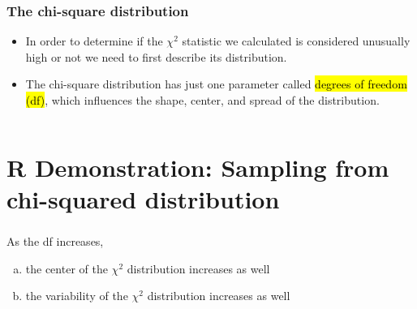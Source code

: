 \documentclass[slidestop,compress,mathserif]{beamer}
\begin{document}

\begin{frame}
\frametitle{The chi-square distribution}

\begin{itemize}

\item In order to determine if the $\chi^2$ statistic we calculated is considered unusually high or not we need to first describe its distribution.

\pause

\item The chi-square distribution has just one parameter called \hl{degrees of freedom (df)}, which influences the shape, center, and spread of the distribution. \\

\end{itemize}

\pause

$\:$ \\


\end{frame}


\section{R Demonstration: Sampling from chi-squared distribution}


\begin{frame}
\frametitle{}


\begin{center}
\end{center}

As the df increases,
\begin{enumerate}[(a)]
\item the center of the $\chi^2$ distribution increases as well
\item the variability of the $\chi^2$ distribution increases as well
\end{enumerate}

\end{frame}
\end{document}

